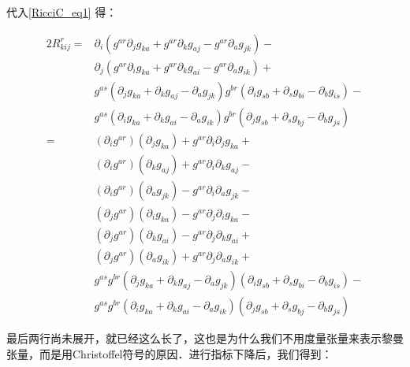 代入\autoref{RicciC_eq1} 得：

\begin{equation}
\begin{aligned}
2R^r_{kij}=&\partial_i(g^{ar}\partial_jg_{ka}+g^{ar}\partial_kg_{aj}-g^{ar}\partial_ag_{jk})-\\
&\partial_j(g^{ar}\partial_ig_{ka}+g^{ar}\partial_kg_{ai}-g^{ar}\partial_ag_{ik})+\\
&g^{as}(\partial_jg_{ka}+\partial_kg_{aj}-\partial_ag_{jk})g^{br}(\partial_ig_{sb}+\partial_sg_{bi}-\partial_bg_{is})-\\
&g^{as}(\partial_ig_{ka}+\partial_kg_{ai}-\partial_ag_{ik})g^{br}(\partial_jg_{sb}+\partial_sg_{bj}-\partial_bg_{js})\\
=&(\partial_ig^{ar})(\partial_jg_{ka})+g^{ar}\partial_i\partial_jg_{ka}+\\
&(\partial_ig^{ar})(\partial_kg_{aj})+g^{ar}\partial_i\partial_kg_{aj}-\\
&(\partial_ig^{ar})(\partial_ag_{jk})-g^{ar}\partial_i\partial_ag_{jk}-\\%
&(\partial_jg^{ar})(\partial_ig_{ka})-g^{ar}\partial_j\partial_ig_{ka}-\\
&(\partial_jg^{ar})(\partial_kg_{ai})-g^{ar}\partial_j\partial_kg_{ai}+\\
&(\partial_jg^{ar})(\partial_ag_{ik})+g^{ar}\partial_j\partial_ag_{ik}+\\%
&g^{as}g^{br}(\partial_jg_{ka}+\partial_kg_{aj}-\partial_ag_{jk})(\partial_ig_{sb}+\partial_sg_{bi}-\partial_bg_{is})-\\
&g^{as}g^{br}(\partial_ig_{ka}+\partial_kg_{ai}-\partial_ag_{ik})(\partial_jg_{sb}+\partial_sg_{bj}-\partial_bg_{js})
\end{aligned}
\end{equation}

最后两行尚未展开，就已经这么长了，这也是为什么我们不用度量张量来表示黎曼张量，而是用Christoffel符号的原因．进行指标下降后，我们得到：

